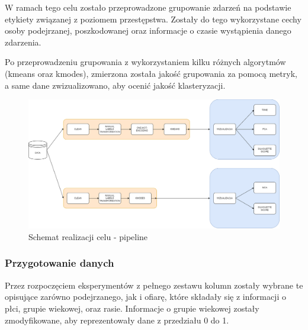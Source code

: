 \documentclass{classrep}
\begin{document}
{{{                W ramach tego celu zostało przeprowadzone grupowanie zdarzeń na
                podstawie etykiety związanej z poziomem przestępstwa. Zostały do tego
                wykorzystane cechy osoby podejrzanej, poszkodowanej oraz informacje o
                czasie wystąpienia danego zdarzenia.

                Po przeprowadzeniu grupowania z wykorzystaniem kilku
                różnych algorytmów (kmeans oraz kmodes), zmierzona
                została jakość grupowania za pomocą metryk, a same dane zwizualizowano,
                aby ocenić jakość klasteryzacji.
                
                \begin{figure}[!htbp]
                    \centering
                    \includegraphics[width=1\textwidth]{img/clustering/Scheme.png}
                    \caption{Schemat realizacji celu - pipeline}
                    \label{scheme}
                \end{figure}
                \FloatBarrier
            }

            \subsubsection{Przygotowanie danych} {
                Przez rozpoczęciem eksperymentów z pełnego zestawu kolumn zostały
                wybrane te opisujące zarówno podejrzanego, jak i ofiarę, które składały
                się z informacji o płci, grupie wiekowej, oraz rasie. Informacje o
                grupie wiekowej zostały zmodyfikowane, aby reprezentowały dane z
                przedziału 0 do 1.
                
}}}
\end{document}
